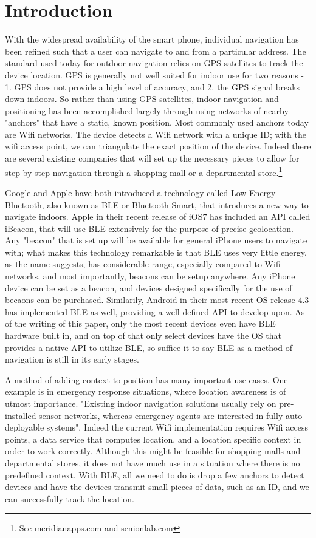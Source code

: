 \documentclass{sig-alternate}
\begin{document}
\section{Introduction}
\label{sec:intro}
 With the widespread availability of the smart phone, individual 
navigation has been refined such that a user can navigate to and 
from a particular address. The standard used today for outdoor 
navigation relies on GPS satellites to track the device location. GPS 
is generally not well suited for indoor use for two reasons - 1. GPS 
does not provide a high level of accuracy, and 2. the GPS signal 
breaks down indoors. So rather than using GPS satellites, indoor 
navigation and positioning has been accomplished largely through 
using networks of nearby "anchors" that have a static, known position. 
Most commonly used anchors today are Wifi networks. The device 
detects a Wifi network with a unique ID; with the wifi access point, 
we can triangulate the exact position of the device. Indeed there are 
several existing companies that will set up the necessary pieces to 
allow for step by step navigation through a shopping mall or a 
departmental store.\footnote{ See meridianapps.com and senionlab.com}

Google and Apple have both introduced a technology called Low 
Energy Bluetooth, also known as BLE or Bluetooth Smart, that 
introduces a new way to navigate indoors. Apple in their recent 
release of iOS7 has included an API called iBeacon, that will use BLE
extensively for the purpose of precise geolocation\cite{apple}. Any "beacon" 
that is set up will be available for general iPhone users to navigate
with; what makes this technology remarkable is that BLE uses very
little energy, as the name suggests, has considerable range, especially
compared to Wifi networks, and most importantly, beacons can be
setup anywhere. Any iPhone device can be set as a beacon, and 
devices designed specifically for the use of becaons can be purchased.
Similarily, Android in their most recent OS release 4.3 has implemented
BLE as well, providing a well defined API\cite{android} to develop upon. 
As of the writing of this paper, only the most recent devices even have 
BLE hardware built in, and on top of that only select devices have the 
OS that provides a native API to utilize BLE, so suffice it to say BLE as a 
method of navigation is still in its early stages.

A method of adding context to position has many important use cases.
One example is in emergency response situations, where location 
awareness is of utmost importance. "Existing indoor navigation solutions
usually rely on pre-installed sensor networks, whereas emergency
agents are interested in fully auto-deployable systems"\cite{renaudin}. 
Indeed the current Wifi implementation requires Wifi access points, a 
data service that computes location, and a location specific context in
order to work correctly. Although this might be feasible for shopping
malls and departmental stores, it does not have much use in a situation
where there is no predefined context. With BLE, all we need to do
is drop a few anchors to detect devices and have the devices transmit
small pieces of data, such as an ID, and we can successfully track
the location.
\end{document}
